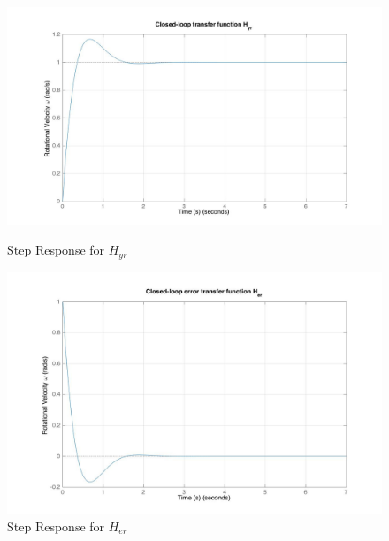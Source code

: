 \documentclass[11pt,titlepage]{article}
\begin{document}
	\begin{figure}[H]
        \centering
        \begin{minipage}{.5\textwidth}
            \centering
            \includegraphics[scale=.18]{Hyr_step1_mat}
            \caption{Step Response for $H_{yr}$}
            \label{fig:Hyr_step1_mat}
        \end{minipage}%
        \begin{minipage}{.5\textwidth}
            \centering
            \includegraphics[scale=.18]{Her_step1_mat}
            \caption{Step Response for $H_{er}$}
            \label{fig:Her_step1_mat}
        \end{minipage}%
    \end{figure}
\end{document}
